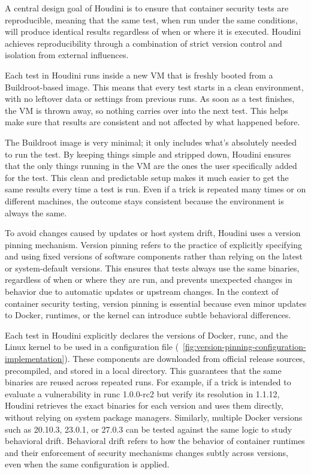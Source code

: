 \begin{doublespace}
A central design goal of Houdini is to ensure that container security tests are reproducible, meaning that the same test, when run under the same conditions, will produce identical results regardless of when or where it is executed. Houdini achieves reproducibility through a combination of strict version control and isolation from external influences.

Each test in Houdini runs inside a new VM that is freshly booted from a Buildroot-based image. This means that every test starts in a clean environment, with no leftover data or settings from previous runs. As soon as a test finishes, the VM is thrown away, so nothing carries over into the next test. This helps make sure that results are consistent and not affected by what happened before.

The Buildroot image is very minimal; it only includes what's absolutely needed to run the test. By keeping things simple and stripped down, Houdini ensures that the only things running in the VM are the ones the user specifically added for the test. This clean and predictable setup makes it much easier to get the same results every time a test is run. Even if a trick is repeated many times or on different machines, the outcome stays consistent because the environment is always the same.

To avoid changes caused by updates or host system drift, Houdini uses a version pinning mechanism. Version pinning refers to the practice of explicitly specifying and using fixed versions of software components rather than relying on the latest or system-default versions. This ensures that tests always use the same binaries, regardless of when or where they are run, and prevents unexpected changes in behavior due to automatic updates or upstream changes. In the context of container security testing, version pinning is essential because even minor updates to Docker, runtimes, or the kernel can introduce subtle behavioral differences.

Each test in Houdini explicitly declares the versions of Docker, runc, and the Linux kernel to be used in a configuration file (~\ref{fig:version-pinning-configuration-implementation}). These components are downloaded from official release sources, precompiled, and stored in a local directory. This guarantees that the same binaries are reused across repeated runs. For example, if a trick is intended to evaluate a vulnerability in runc 1.0.0-rc2 but verify its resolution in 1.1.12, Houdini retrieves the exact binaries for each version and uses them directly, without relying on system package managers. Similarly, multiple Docker versions such as 20.10.3, 23.0.1, or 27.0.3 can be tested against the same logic to study behavioral drift. Behavioral drift refers to how the behavior of container runtimes and their enforcement of security mechanisms changes subtly across versions, even when the same configuration is applied.



\end{doublespace}
